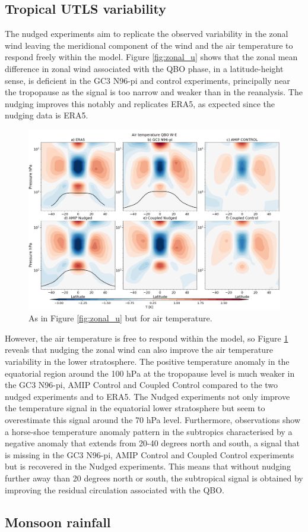 \subsection{Tropical UTLS variability}

The nudged experiments aim to replicate the observed variability in the zonal wind leaving the meridional component of the wind and the air temperature to respond freely within the model. 
Figure \ref{fig:zonal_u} shows that the zonal mean difference in zonal wind associated with the QBO phase, in a latitude-height sense, is deficient in the GC3 N96-pi and control experiments, principally near the tropopause as the signal is too narrow and weaker than in the reanalysis. 
The nudging improves this notably and replicates ERA5, as expected since the nudging data is ERA5.  

\begin{figure}[t!]
\centering
 \includegraphics[width=\linewidth]{figures/zonalplotair_temperature.png}
\caption[Zonal mean air temperature QBO difference]{As in Figure \ref{fig:zonal_u} but for air temperature.  }
\label{fig:zonal_T}
\end{figure}

However, the air temperature is free to respond within the model, so Figure \ref{fig:zonal_T} reveals that nudging the zonal wind can also improve the air temperature variability in the lower stratosphere. The positive temperature anomaly in the equatorial region around the 100 hPa at the tropopause level is much weaker in the GC3 N96-pi, AMIP Control and Coupled Control compared to the two nudged experiments and to ERA5. The Nudged experiments not only improve the temperature signal in the equatorial lower stratosphere but seem to overestimate this signal around the 70 hPa level. Furthermore, observations show a horse-shoe temperature anomaly pattern in the subtropics characterised by a negative anomaly that extends from 20-40 degrees north and south, a signal that is missing in the GC3 N96-pi, AMIP Control and Coupled Control experiments but is recovered in the Nudged experiments. This means that without nudging further away than 20 degrees north or south, the subtropical signal is obtained by improving the residual circulation associated with the QBO. 



\subsection{Monsoon rainfall}
